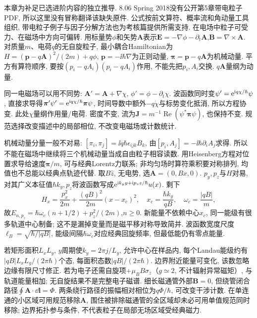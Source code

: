 本章为补足已选进阶内容的独立推导. 8.06 Spring 2018没有公开第5章带电粒子PDF, 所以这里没有冒称翻译该缺失原件. 公式按前文算符、概率流和角动量工具组织, 带电粒子例子与因子分解方法也为考核篇提供所需支持.
在电场中粒子可受力、在磁场中方向可偏转. 用标量势$\phi$和矢势$\boldsymbol A$表示$\boldsymbol E=-\nabla\phi-\partial_t\boldsymbol A$,$\boldsymbol B=\nabla\times\boldsymbol A$. 对质量$m$、电荷$q$的无自旋粒子, 最小耦合Hamiltonian为$H=(\boldsymbol p-q\boldsymbol A)^2/(2m)+q\phi$, $\boldsymbol p=-\ii\hbar\nabla$为正则动量, $\boldsymbol\pi=\boldsymbol p-q\boldsymbol A$为机械动量. 平方有算符顺序, 要按$(p_i-qA_i)(p_i-qA_i)$作用, 不能先把$p_i,A_i$交换. $q\boldsymbol A$量纲为动量.

同一电磁场可以用不同势: $\boldsymbol A' =\boldsymbol A+\nabla\chi$, $\phi'=\phi-\partial_t\chi$. 波函数同时变$\psi'=\mathrm e^{\mathrm i q\chi/\hbar}\psi$, 直接求导得$\boldsymbol\pi'\psi'=\mathrm e^{\mathrm i q\chi/\hbar}\boldsymbol\pi\psi$, 时间导数中额外$-q\dot\chi$与标势变化抵消, 所以方程协变. 此处$\chi$量纲作用量/电荷. 密度不变, 流为$\boldsymbol J=m^{-1}\operatorname{Re}(\psi^*\boldsymbol\pi\psi)$, 也保持不变. 规范选择改变描述中的局部相位, 不改变电磁场或计数统计.

机械动量分量一般不对易: $[\pi_i,\pi_j]=\ii q\hbar\epsilon_{ijk}B_k$, 由$[p_i,A_j]=-\ii\hbar\partial_iA_j$求得. 所以不能在磁场中继续将三个机械动量当成自由粒子相容读数. 用Heisenberg方程对位置求导给速度$\boldsymbol\pi/m$, 可与经典Lorentz力联系; 非均匀场时算符乘积要对称排列, 均值也不总能以经典点轨迹代替.
取$B\hat z$, 无电势, 选$\boldsymbol A=(0,Bx,0)$. $p_y,p_z$与$H$对易, 对其广义本征值$\hbar k_y,p_z$将波函数写成$\mathrm e^{\mathrm i k_yy+\mathrm i p_zz/\hbar}u(x)$. 剩下
\[
H_x=\frac{p_x^2}{2m}+\frac{(qB)^2}{2m}(x-x_c)^2,\quad
x_c=\frac{\hbar k_y}{qB},\quad\omega_c=\frac{|qB|}{m},
\]
故$E_{n,p_z}=\hbar\omega_c(n+1/2)+p_z^2/(2m)$,$n\geq0$. 新能量不依赖中心$x_c$, 同一能级有很多轨道中心制备; 这不是漏掉变量而是磁平移对称导致简并. 波函数宽度尺度$\ell_B=\sqrt{\hbar/|qB|}$, 能级间隔$\hbar\omega_c$对应经典回旋频率, 但最低能仍有零点能量.

若矩形面积$L_xL_y$, $y$周期使$k_y=2\pi j/L_y$, 允许中心在样品内, 每个Landau能级约有$|qB|L_xL_y/(2\pi\hbar)$个态, 每面积态数$|qB|/(2\pi\hbar)$. 边界附近能量可变化, 该数忽略边缘有限尺寸修正. 若为电子还需自旋项$+\mu_BB\sigma_z$（$g\simeq2$, 不计辐射异常磁矩）, 与轨道能量相加; 无自旋结果不是完整电子磁谱.
细长磁通管外部$\boldsymbol B=0$, 但绕管闭合路径$\oint\boldsymbol A\cdot\dd\boldsymbol l=\Phi$. 两条绕行路径的振幅相对相位为$q\Phi/\hbar$, 可改变干涉计数. 在单连通的小区域可用规范移除$\boldsymbol A$, 围住被排除磁通管的全区域却未必可用单值规范同时移除; 边界拓扑参与条件, 不代表粒子在局部无场区域受经典磁力.

